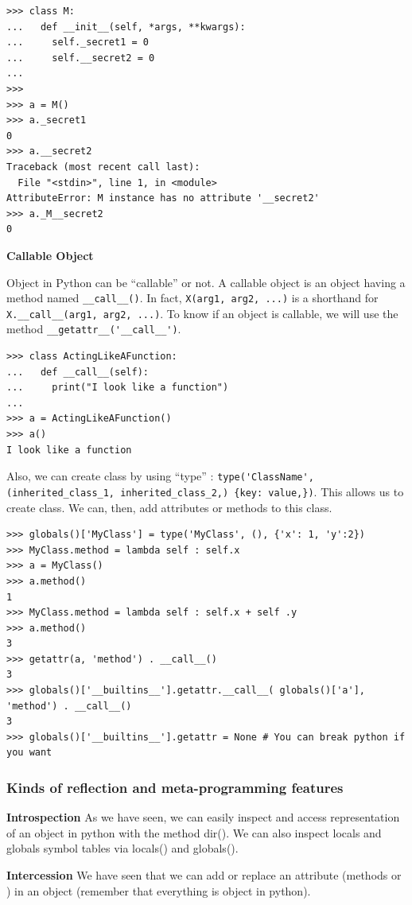 \documentclass[a4paper,10pt]{article}
\begin{document}
\begin{lstlisting}
>>> class M:
...   def __init__(self, *args, **kwargs):
...     self._secret1 = 0
...     self.__secret2 = 0
...
>>>
>>> a = M()
>>> a._secret1
0
>>> a.__secret2
Traceback (most recent call last):
  File "<stdin>", line 1, in <module>
AttributeError: M instance has no attribute '__secret2'
>>> a._M__secret2
0
\end{lstlisting}

\textbf{Callable Object}

Object in Python can be “callable” or not. A callable object is an object having a method named \lstinline|__call__()|. In fact, \lstinline|X(arg1, arg2, ...)| is a shorthand for \lstinline|X.__call__(arg1, arg2, ...)|. To know if an object is callable, we will use the method \lstinline|__getattr__('__call__')|.

\begin{lstlisting}
>>> class ActingLikeAFunction:
...   def __call__(self):
...     print("I look like a function")
...
>>> a = ActingLikeAFunction()
>>> a()
I look like a function
\end{lstlisting}

Also, we can create class by using ``type'' : \lstinline|type('ClassName', (inherited_class_1, inherited_class_2,) {key: value,})|. This allows us to create class. We can, then, add attributes or methods to this class.

\begin{lstlisting}
>>> globals()['MyClass'] = type('MyClass', (), {'x': 1, 'y':2})
>>> MyClass.method = lambda self : self.x
>>> a = MyClass()
>>> a.method()
1
>>> MyClass.method = lambda self : self.x + self .y
>>> a.method()
3
>>> getattr(a, 'method') . __call__()
3
>>> globals()['__builtins__'].getattr.__call__( globals()['a'], 'method') . __call__()
3
>>> globals()['__builtins__'].getattr = None # You can break python if you want
\end{lstlisting}

\subsubsection{Kinds of reflection and meta-programming features}

\textbf{Introspection}
As we have seen, we can easily inspect and access representation of an object in python with the method dir(). We can also inspect locals and globals symbol tables via locals() and globals(). 

\textbf{Intercession}
We have seen that we can add or replace an attribute (methods or ) in an object (remember that everything is object in python).
\end{document}
